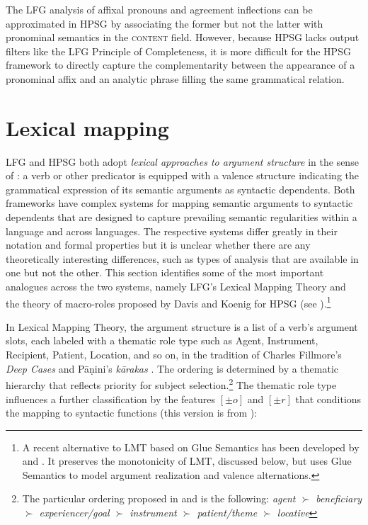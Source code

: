 
The LFG analysis of  affixal pronouns and agreement inflections can be approximated in HPSG by associating the former but not the latter with pronominal semantics in the \textsc{content} field.  However, because HPSG lacks output filters like the LFG Principle of Completeness, it is more difficult for the HPSG framework to directly capture the complementarity between the appearance of a pronominal affix and an analytic phrase filling the same grammatical relation. 
                  
\section{Lexical mapping}
LFG and HPSG both adopt \textit{lexical approaches to argument structure} in the sense of \citet{MWArgSt}: a verb or other predicator is equipped with a valence structure indicating the grammatical expression of its semantic arguments as syntactic dependents.  Both frameworks have complex systems for mapping semantic arguments to syntactic dependents that are designed to capture prevailing semantic regularities within a language and across languages.   The respective systems differ greatly in their notation and formal properties but it is unclear whether 
there are any theoretically interesting differences, such as types of analysis that are available in one but not the other.  This section identifies some of the most important  analogues across the two systems, namely LFG's Lexical Mapping Theory \citep[chapter 14]{BATW2015a} and the theory of macro-roles proposed by Davis and Koenig for HPSG (see ).\footnote{A recent alternative to LMT based on Glue Semantics has been developed by \citet{asudeh;giorgolo-lfg12} and \citet{asudeh;ea14-lfg}. It preserves the monotonicity of LMT, discussed below, but uses Glue Semantics to model argument realization and valence alternations.}
 
In Lexical Mapping Theory, the argument structure is a list of a verb's argument slots, each labeled with a thematic role type such as Agent, Instrument, Recipient, Patient, Location, and so on, in the tradition of Charles Fillmore's \textit{Deep Cases} \citep{Fillmore68,Fillmore77} and P\={a}\d{n}ini's \textit{k\={a}rakas} \citep{kiparsky+staal:1969}.  The ordering is determined by a thematic hierarchy that reflects priority for subject selection.\footnote{The particular ordering proposed in \cite{BresnanK89a-u} and 
\cite{Bresnan+etal:2015} is the following:  
{\it agent $\succ$ beneficiary $\succ$
experiencer/goal $\succ$ instrument $\succ$ patient/theme $\succ$
locative}}  The thematic role type influences a further classification by the features $[\pm o]$ and $[\pm r]$ that conditions the mapping to syntactic functions (this version is from \citet[p. \ 331]{Bresnan+etal:2015}):

